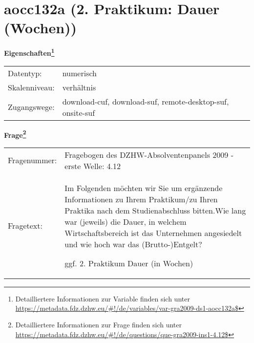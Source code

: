 
    \setcounter{footnote}{0}

    \vspace*{-1.8cm}
	\section{aocc132a (2. Praktikum: Dauer (Wochen))}
	\label{section:aocc132a}



    \vspace*{0.5cm}
    \noindent\textbf{Eigenschaften\footnote{Detailliertere Informationen zur Variable finden sich unter
		\url{https://metadata.fdz.dzhw.eu/\#!/de/variables/var-gra2009-ds1-aocc132a$}}}\\
	\begin{tabularx}{\hsize}{@{}lX}
	Datentyp: & numerisch \\
	Skalenniveau: & verhältnis \\
	Zugangswege: &
	  download-cuf, 
	  download-suf, 
	  remote-desktop-suf, 
	  onsite-suf
 \\
    \end{tabularx}



				\vspace*{0.5cm}
                \noindent\textbf{Frage\footnote{Detailliertere Informationen zur Frage finden sich unter
		              \url{https://metadata.fdz.dzhw.eu/\#!/de/questions/que-gra2009-ins1-4.12$}}}\\
				\begin{tabularx}{\hsize}{@{}lX}
					Fragenummer: &
					  Fragebogen des DZHW-Absolventenpanels 2009 - erste Welle:
					  4.12
 \\
					Fragetext: & Im Folgenden möchten wir Sie um ergänzende Informationen zu Ihrem Praktikum/zu Ihren Praktika nach dem Studienabschluss bitten.Wie lang war (jeweils) die Dauer, in welchem Wirtschaftsbereich ist das Unternehmen angesiedelt und wie hoch war das (Brutto-)Entgelt?\par  ggf. 2. Praktikum Dauer (in Wochen) \\
				\end{tabularx}





